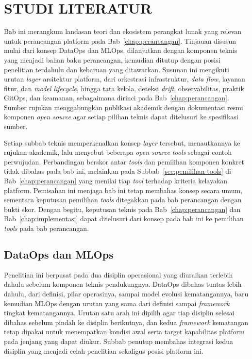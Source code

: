 \cleardoublepage
\chapter{STUDI LITERATUR}
\label{chap:studi-literatur}

Bab ini merangkum landasan teori dan ekosistem perangkat lunak yang relevan untuk perancangan platform pada Bab~\ref{chap:perancangan}. Tinjauan disusun mulai dari konsep DataOps dan MLOps, dilanjutkan dengan komponen teknis yang menjadi bahan baku perancangan, kemudian ditutup dengan posisi penelitian terdahulu dan kebaruan yang ditawarkan. Susunan ini mengikuti urutan \textit{layer} arsitektur platform, dari orkestrasi infrastruktur, \textit{data flow}, layanan fitur, dan \textit{model lifecycle}, hingga tata kelola, deteksi \textit{drift}, observabilitas, praktik GitOps, dan keamanan, sebagaimana dirinci pada Bab~\ref{chap:perancangan}. Sumber rujukan menggabungkan publikasi akademik dengan dokumentasi resmi komponen \textit{open source} agar setiap pilihan teknis dapat ditelusuri ke spesifikasi sumber.

Setiap subbab teknis memperkenalkan konsep \textit{layer} tersebut, menautkannya ke rujukan akademik, lalu menyebut beberapa \textit{open source tools} sebagai contoh perwujudan. Perbandingan berskor antar \textit{tools} dan pemilihan komponen konkret tidak dibahas pada bab ini, melainkan pada Subbab~\ref{sec:pemilihan-tools} di Bab~\ref{chap:perancangan} yang menilai tiap \textit{tool} terhadap kriteria kelayakan platform. Pemisahan ini menjaga bab ini tetap membahas konsep secara umum, sementara keputusan pemilihan \textit{tools} ditegakkan pada bab perancangan dengan bukti skor. Dengan begitu, keputusan teknis pada Bab~\ref{chap:perancangan} dan Bab~\ref{chap:implementasi} dapat ditelusuri dari konsep pada bab ini ke pemilihan \textit{tools} pada bab perancangan.

\section{DataOps dan MLOps}
\label{sec:dataops-mlops}

Penelitian ini berpusat pada dua disiplin operasional yang diuraikan terlebih dahulu sebelum komponen teknis pendukungnya. DataOps dibahas tuntas lebih dahulu, dari definisi, pilar operasinya, sampai model evolusi kematangannya, baru kemudian MLOps dengan urutan yang sama dari definisi sampai \textit{framework} tingkat kematangannya. Urutan satu arah ini dipilih agar tiap disiplin selesai dibahas sebelum pindah ke disiplin berikutnya, dan kedua \textit{framework} kematangan tetap dipakai untuk menempatkan kondisi awal serta target kapabilitas platform pada jenjang yang dapat diukur. Subbab penutup membahas integrasi kedua disiplin yang menjadi celah penelitian sekaligus posisi platform ini.

